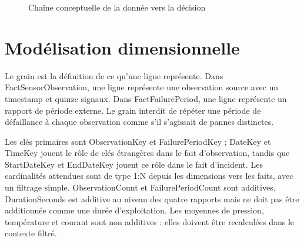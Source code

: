 \begin{figure}[H]
\centering
{}
\caption{Chaîne conceptuelle de la donnée vers la décision}
\label{fig:bi-chain}
\end{figure}

\section{Modélisation dimensionnelle}
Le grain est la définition de ce qu'une ligne représente. Dans FactSensorObservation, une ligne représente une observation source avec un timestamp et quinze signaux. Dans FactFailurePeriod, une ligne représente un rapport de période externe. Le grain interdit de répéter une période de défaillance à chaque observation comme s'il s'agissait de pannes distinctes.

Les clés primaires sont ObservationKey et FailurePeriodKey ; DateKey et TimeKey jouent le rôle de clés étrangères dans le fait d'observation, tandis que StartDateKey et EndDateKey jouent ce rôle dans le fait d'incident. Les cardinalités attendues sont de type 1:N depuis les dimensions vers les faits, avec un filtrage simple. ObservationCount et FailurePeriodCount sont additives. DurationSeconds est additive au niveau des quatre rapports mais ne doit pas être additionnée comme une durée d'exploitation. Les moyennes de pression, température et courant sont non additives : elles doivent être recalculées dans le contexte filtré.

